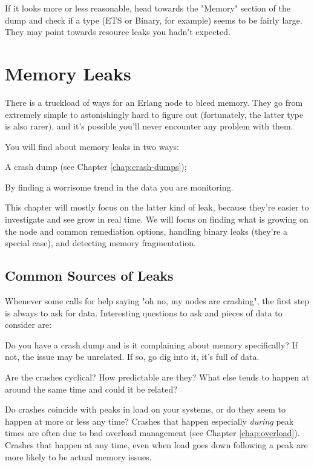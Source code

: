 \documentclass[11pt, oneside]{book}   	%
\begin{document}
If it looks more or less reasonable, head towards the "Memory" section of the dump and check if a type (ETS or Binary, for example) seems to be fairly large. They may point towards resource leaks you hadn't expected.

\chapter{Memory Leaks}
\label{chap:memory-leaks}

There is a truckload of ways for an Erlang node to bleed memory. They go from extremely simple to astonishingly hard to figure out (fortunately, the latter type is also rarer), and it's possible you'll never encounter any problem with them.

You will find about memory leaks in two ways:

\begin{enumerate*}
	\item A crash dump (see Chapter \ref{chap:crash-dumps});
	\item By finding a worrisome trend in the data you are monitoring. 
\end{enumerate*}

This chapter will mostly focus on the latter kind of leak, because they're easier to investigate and see grow in real time. We will focus on finding what is growing on the node and common remediation options, handling binary leaks (they're a special case),  and detecting memory fragmentation. 
\section{Common Sources of Leaks}

Whenever some calls for help saying "oh no, my nodes are crashing", the first step is always to ask for data. Interesting questions to ask and pieces of data to consider are:

\begin{itemize*}
	\item Do you have a crash dump and is it complaining about memory specifically? If not, the issue may be unrelated. If so, go dig into it, it's full of data.
	\item Are the crashes cyclical? How predictable are they? What else tends to happen at around the same time and could it be related?
	\item Do crashes coincide with peaks in load on your systems, or do they seem to happen at more or less any time? Crashes that happen especially \emph{during} peak times are often due to bad overload management (see Chapter \ref{chap:overload}). Crashes that happen at any time, even when load goes down following a peak are more likely to be actual memory issues.
\end{itemize*}
\end{document}
